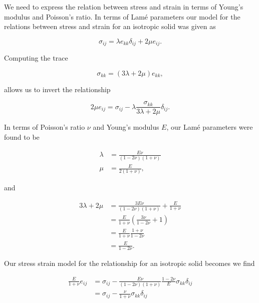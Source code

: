 \begin{Answer}[ref={problem:continuumProblemSet1:q1}]

We need to express the relation between stress and strain in terms of Young's modulus and Poisson's ratio.  In terms of Lam\'e parameters our model for the relations between stress and strain for an isotropic solid was given as

\begin{equation}\label{eqn:continuumProblemSet1:110}
\sigma_{ij} = \lambda e_{kk} \delta_{ij} + 2 \mu e_{ij}.
\end{equation}

Computing the trace

\begin{equation}\label{eqn:continuumProblemSet1:130}
\sigma_{kk} = (3 \lambda + 2 \mu) e_{kk},
\end{equation}

allows us to invert the relationship

\begin{equation}\label{eqn:continuumProblemSet1:150}
2 \mu e_{ij} = \sigma_{ij} - \lambda \frac{\sigma_{kk}}{3 \lambda + 2 \mu} \delta_{ij}.
\end{equation}

In terms of Poisson's ratio $\nu$ and Young's modulus $E$, our Lam\'e parameters were found to be

\begin{align}\label{eqn:continuumProblemSet1:170}
\lambda &= \frac{ E \nu }{(1 - 2 \nu)(1 + \nu)} \\
\mu &= \frac{E}{2(1 + \nu)},
\end{align}

and

\begin{align*}
3 \lambda + 2 \mu
&= \frac{ 3 E \nu }{(1 - 2 \nu)(1 + \nu)} + \frac{E}{1 + \nu} \\
&= \frac{E}{1 + \nu} \left( \frac{3 \nu}{1 - 2 \nu} + 1\right) \\
&= \frac{E}{1 + \nu} \frac{1 + \nu}{1 - 2 \nu} \\
&= \frac{E}{1 - 2 \nu}.
\end{align*}

Our stress strain model for the relationship for an isotropic solid becomes
we find

\begin{align*}
\frac{E}{1 + \nu} e_{ij}
&=
\sigma_{ij}
-
\frac{ E \nu }{(1 - 2 \nu)(1 + \nu)} \frac{1 - 2 \nu}{E}
\sigma_{kk} \delta_{ij} \\
&=
\sigma_{ij}
-
\frac{ \nu }{1 + \nu}
\sigma_{kk} \delta_{ij} \\
\end{align*}


\end{Answer}
